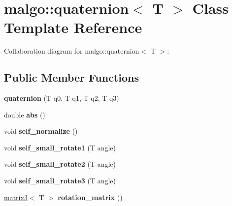 \hypertarget{classmalgo_1_1quaternion}{}\section{malgo\+:\+:quaternion$<$ T $>$ Class Template Reference}
\label{classmalgo_1_1quaternion}


Collaboration diagram for malgo\+:\+:quaternion$<$ T $>$\+:
\subsection*{Public Member Functions}
\begin{DoxyCompactItemize}
\item 
{\bfseries quaternion} (T q0, T q1, T q2, T q3)\hypertarget{classmalgo_1_1quaternion_af8a616a686737866ddfb14704f9c3652}{}\label{classmalgo_1_1quaternion_af8a616a686737866ddfb14704f9c3652}

\item 
double {\bfseries abs} ()\hypertarget{classmalgo_1_1quaternion_af42a5b7ef4a88a94ab79638b7e61ab23}{}\label{classmalgo_1_1quaternion_af42a5b7ef4a88a94ab79638b7e61ab23}

\item 
void {\bfseries self\+\_\+normalize} ()\hypertarget{classmalgo_1_1quaternion_a1099b5ef7a34f2407b0f7ed19d520d07}{}\label{classmalgo_1_1quaternion_a1099b5ef7a34f2407b0f7ed19d520d07}

\item 
void {\bfseries self\+\_\+small\+\_\+rotate1} (T angle)\hypertarget{classmalgo_1_1quaternion_a309b1f7ec46f65cc01a54533acc9728a}{}\label{classmalgo_1_1quaternion_a309b1f7ec46f65cc01a54533acc9728a}

\item 
void {\bfseries self\+\_\+small\+\_\+rotate2} (T angle)\hypertarget{classmalgo_1_1quaternion_a70e969d03dc7ffef2eabb8a753e3413b}{}\label{classmalgo_1_1quaternion_a70e969d03dc7ffef2eabb8a753e3413b}

\item 
void {\bfseries self\+\_\+small\+\_\+rotate3} (T angle)\hypertarget{classmalgo_1_1quaternion_a232aab682abebc7994354e198ab0036e}{}\label{classmalgo_1_1quaternion_a232aab682abebc7994354e198ab0036e}

\item 
\hyperlink{classmalgo_1_1matrix3}{matrix3}$<$ T $>$ {\bfseries rotation\+\_\+matrix} ()\hypertarget{classmalgo_1_1quaternion_adc647adac1a11d5351ccc2df79d0a7f0}{}\label{classmalgo_1_1quaternion_adc647adac1a11d5351ccc2df79d0a7f0}


\end{DoxyCompactItemize}
